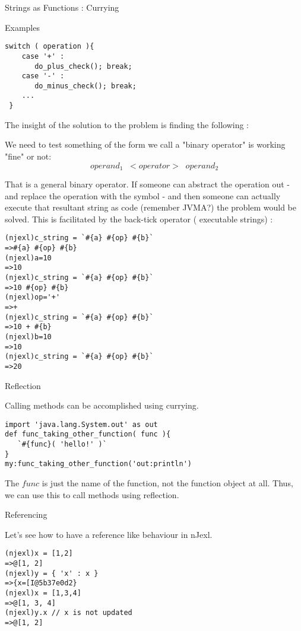 \begin{section}{Strings as Functions : Currying}
\begin{subsection}{Examples}
\begin{lstlisting}[style=JexlStyle]
switch ( operation ){
    case '+' :
       do_plus_check(); break;
    case '-' :
       do_minus_check(); break;
    ...
 }
\end{lstlisting} 

The insight of the solution to the problem is finding the following :

\begin{center}
We need to test something of the form we call a "binary operator" is working "fine" or not:
$$
operand_1 \; \;  <operator> \; \;  operand_2 
$$
\end{center}

That is a general binary operator. If someone can abstract the operation out - and replace the operation with the symbol - 
and then someone can actually execute that resultant string as code (remember JVMA?) the problem would be solved.
This is facilitated by the back-tick operator ( executable strings) :

\begin{lstlisting}[style=all]
(njexl)c_string = `#{a} #{op} #{b}`
=>#{a} #{op} #{b}
(njexl)a=10
=>10
(njexl)c_string = `#{a} #{op} #{b}`
=>10 #{op} #{b}
(njexl)op='+'
=>+
(njexl)c_string = `#{a} #{op} #{b}`
=>10 + #{b}
(njexl)b=10
=>10
(njexl)c_string = `#{a} #{op} #{b}`
=>20
\end{lstlisting}
\end{subsection}

\begin{subsection}{Reflection}

Calling methods can be accomplished using currying. 

\begin{lstlisting}[style=JexlStyle]
import 'java.lang.System.out' as out 
def func_taking_other_function( func ){
   `#{func}( 'hello!' )`
}
my:func_taking_other_function('out:println')
\end{lstlisting}
The $func$ is just the name of the function, not the function object at all.
Thus, we can use this to call methods using reflection.
\end{subsection}

\begin{subsection}{Referencing}

Let's see how to have a reference like behaviour in nJexl.

\begin{lstlisting}[style=all]
(njexl)x = [1,2]
=>@[1, 2]
(njexl)y = { 'x' : x }
=>{x=[I@5b37e0d2}
(njexl)x = [1,3,4]
=>@[1, 3, 4]
(njexl)y.x // x is not updated 
=>@[1, 2]
\end{lstlisting}


\end{subsection}
\end{section}
